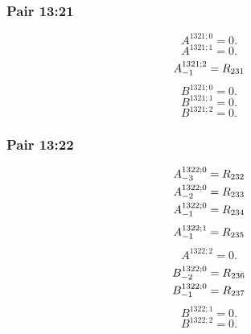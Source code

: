 \documentclass[11pt,a4paper]{article}
\begin{document}
\subsubsection{Pair 13:21}
\begin{equation}
A^{1321;0}=0.
\label{eq:cat-map-366}
\end{equation}
\begin{equation}
A^{1321;1}=0.
\label{eq:cat-map-367}
\end{equation}
\begin{equation}
\shortstack[l]{$\displaystyle A^{1321;2}_{-1}=R_{231}$}
\label{eq:cat-map-368}
\end{equation}
\begin{equation}
B^{1321;0}=0.
\label{eq:cat-map-369}
\end{equation}
\begin{equation}
B^{1321;1}=0.
\label{eq:cat-map-370}
\end{equation}
\begin{equation}
B^{1321;2}=0.
\label{eq:cat-map-371}
\end{equation}
\subsubsection{Pair 13:22}
\begin{equation}
\shortstack[l]{$\displaystyle A^{1322;0}_{-3}=R_{232}$\\
$\displaystyle A^{1322;0}_{-2}=R_{233}$\\
$\displaystyle A^{1322;0}_{-1}=R_{234}$}
\label{eq:cat-map-372}
\end{equation}
\begin{equation}
\shortstack[l]{$\displaystyle A^{1322;1}_{-1}=R_{235}$}
\label{eq:cat-map-373}
\end{equation}
\begin{equation}
A^{1322;2}=0.
\label{eq:cat-map-374}
\end{equation}
\begin{equation}
\shortstack[l]{$\displaystyle B^{1322;0}_{-2}=R_{236}$\\
$\displaystyle B^{1322;0}_{-1}=R_{237}$}
\label{eq:cat-map-375}
\end{equation}
\begin{equation}
B^{1322;1}=0.
\label{eq:cat-map-376}
\end{equation}
\begin{equation}
B^{1322;2}=0.
\label{eq:cat-map-377}
\end{equation}
\end{document}
